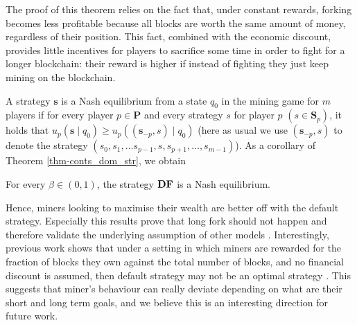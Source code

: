 \documentclass[a4paper,english,cleveref, autoref,numberwithinsect]{lipics-v2019}
\newcommand{\bs}{\mathbf{s}}
\newcommand{\bP}{\mathbf{P}}
\newcommand{\bS}{\mathbf{S}}
\newcommand{\cdf}{\text{\rm {\bf DF}}}
\begin{document}
The proof of this theorem relies on the fact that, under constant rewards, forking becomes less profitable because all blocks are worth the same amount of money, regardless of their position. This fact, combined with the economic discount, provides little incentives for players to sacrifice some time in order to fight for a longer blockchain: their reward is higher if instead of fighting they just keep mining on the blockchain. 

A strategy $\bs$ is a Nash equilibrium from a state $q_0$ in the %
mining game for $m$ players if for every player $p \in \bP$ and every strategy $s$ for player $p$ $(s \in\bS_p)$, it holds that $u_p(\bs \mid q_0)  \geq  u_p ((\bs_{-p},s) \mid q_0)$ (here 
as usual we use $(\bs_{-p}, s)$ to denote the strategy $(s_0, s_1, \ldots s_{p-1},s,s_{p+1}, \ldots, s_{m-1})$). As a corollary of Theorem \ref{thm-conts_dom_str}, we obtain
\begin{corollary}\label{cor-conts_equlibria}
For every $\beta \in (0,1)$, the strategy $\cdf$ is a Nash equilibrium.
\end{corollary} 

Hence, miners looking to maximise their %
wealth are better off with the default strategy. 
Especially this results prove that long fork should not happen and therefore validate the underlying assumption of other models \cite{mininggames:2016}. 
Interestingly,  previous work shows that under a setting in which 
miners are rewarded for the fraction of blocks they own against the total number of blocks, and no financial discount is assumed, then default strategy may not be an optimal strategy  \cite{mininggames:2016}.
This suggests that miner's behaviour can really deviate depending on what are their short and long term goals, and we believe this is an interesting direction for future work. 
\end{document}
